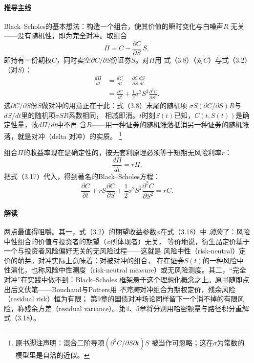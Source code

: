 \paragraph{推导主线}
Black--Scholes的基本想法：构造一个组合，使其价值的瞬时变化与白噪声$R$
无关——没有随机性，即为完全对冲。取组合
\begin{equation*}
\Pi=C-\frac{\partial C}{\partial S}\,S,
\tag{3.16}
\end{equation*}
即持有一份期权$C$，同时卖空$\partial C/\partial S$份证券$S$。对$\Pi$用
式（3.8）（对$C$）与式（3.2）（对$S$）：
\begin{align*}
\frac{d\Pi}{dt}
&=\frac{dC}{dt}-\frac{\partial C}{\partial S}\frac{dS}{dt}\\
&=\frac{\partial C}{\partial t}
+\frac{1}{2}\sigma^{2}S^{2}\frac{\partial^{2}C}{\partial S^{2}}.
\tag{3.17}
\end{align*}
选$\partial C/\partial S$份$S$做对冲的用意正在于此：式（3.8）末尾的随机项
$\sigma S(\partial C/\partial S)R$与$dS/dt$里的随机项$\sigma SR$系数相同，
相减即消。$t$时刻$S(t)$已知，$C(t,S(t))$是确定性量，故$d\Pi/dt$中不再
含$R$——用一种证券的随机涨落抵消另一种证券的随机涨落，就是对冲（delta
对冲）的实质。
\footnote{原书脚注声明：混合二阶导项$(\partial^{2}C/\partial S\partial t)S$
被当作可忽略；这在$\sigma$为常数的模型里是自洽的近似。}

组合$\Pi$的收益率现在是确定性的，按无套利原理必须等于短期无风险利率$r$：
\begin{equation*}
\frac{d\Pi}{dt}=r\Pi.
\end{equation*}
把式（3.17）代入，得到著名的Black--Scholes方程：
\begin{equation*}
\frac{\partial C}{\partial t}
+rS\frac{\partial C}{\partial S}
+\frac{1}{2}\sigma^{2}S^{2}\frac{\partial^{2}C}{\partial S^{2}}
=rC.
\tag{3.18}
\end{equation*}

\paragraph{解读}
两点最值得咀嚼。其一，式（3.2）的期望收益参数$\phi$在式（3.18）中
\emph{消失}了：风险中性组合的价值与投资者的期望（$\phi$所体现者）无关，
等价地说，衍生品定价基于一个与投资者风险偏好无关的无风险过程——这就是
风险中性（risk-neutral）定价的萌芽。对冲实际上意味着：对被对冲的组合，
存在证券$S(t)$的一种风险中性演化，也称风险中性测度（risk-neutral
measure）或无风险测度。其二，“完全对冲”在实践中做不到：Black--Scholes
框架悬于这个理想化概念之上。原书随即点出后文伏笔——Bouchaud与Potters用
\emph{不完美}对冲组合为期权定价，残余风险（residual risk）恒为有限；
第9章的国债对冲场论同样留下一个消不掉的有限风险，称残余方差（residual
variance）。第4、5章将分别用哈密顿量与路径积分重解式（3.18）。

